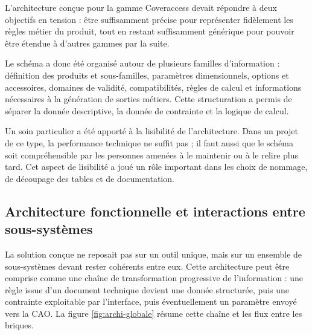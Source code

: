 L'architecture conçue pour la gamme Coveraccess devait répondre à deux objectifs en tension : être suffisamment précise pour représenter fidèlement les règles métier du produit, tout en restant suffisamment générique pour pouvoir être étendue à d'autres gammes par la suite.

Le schéma a donc été organisé autour de plusieurs familles d'information : définition des produits et sous-familles, paramètres dimensionnels, options et accessoires, domaines de validité, compatibilités, règles de calcul et informations nécessaires à la génération de sorties métiers. Cette structuration a permis de séparer la donnée descriptive, la donnée de contrainte et la logique de calcul.

Un soin particulier a été apporté à la lisibilité de l'architecture. Dans un projet de ce type, la performance technique ne suffit pas ; il faut aussi que le schéma soit compréhensible par les personnes amenées à le maintenir ou à le relire plus tard. Cet aspect de lisibilité a joué un rôle important dans les choix de nommage, de découpage des tables et de documentation.

\subsection{Architecture fonctionnelle et interactions entre sous-systèmes}

La solution conçue ne reposait pas sur un outil unique, mais sur un ensemble de sous-systèmes devant rester cohérents entre eux. Cette architecture peut être comprise comme une chaîne de transformation progressive de l'information : une règle issue d'un document technique devient une donnée structurée, puis une contrainte exploitable par l'interface, puis éventuellement un paramètre envoyé vers la CAO. La figure \ref{fig:archi-globale} résume cette chaîne et les flux entre les briques.

